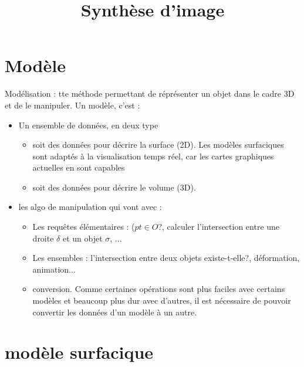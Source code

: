 \documentclass[11pt]{cours}
\title{Synthèse d'image}
\begin{document}
\maketitle

\section{Modèle}
Modélisation : tte méthode permettant de réprésenter un objet dans le cadre 3D et de le manipuler.
Un modèle, c'est :

\begin{itemize}
	\item Un ensemble de données, en deux type
	\begin{itemize}
		\item soit des données pour décrire la surface (2D). Les modèles surfaciques sont adaptés à la visualisation temps réel, car les cartes graphiques actuelles en sont capables
			\item soit des données pour décrire le volume (3D).
	\end{itemize}
	\item les algo de manipulation qui vont avec : 
	\begin{itemize}
		\item Les requêtes élémentaires : ($pt \in O$?, calculer l'intersection entre une droite $\delta$ et un objet $\sigma$, ...
		\item Les ensembles : l'intersection entre deux objets existe-t-elle?, déformation, animation...
		\item conversion. Comme certaines opérations sont plus faciles avec certains modèles et beaucoup plus dur avec d'autres, il est nécessaire de pouvoir convertir les données d'un modèle à un autre.
	\end{itemize}
\end{itemize}

\section{modèle surfacique}
\end{document}
